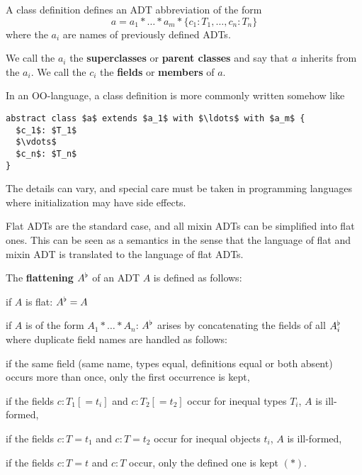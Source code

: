 \begin{definition}[Class]
A class definition defines an ADT abbreviation of the form
\[a = a_1*\ldots*a_m*\{c_1:T_1,\ldots,c_n:T_n\}\]
where the $a_i$ are names of previously defined ADTs.

We call the $a_i$ the \textbf{superclasses} or \textbf{parent classes} and say that $a$ inherits from the $a_i$.
We call the $c_i$ the \textbf{fields} or \textbf{members} of $a$.
\end{definition}

In an OO-language, a class definition is more commonly written somehow like
\begin{lstlisting}
abstract class $a$ extends $a_1$ with $\ldots$ with $a_m$ {
  $c_1$: $T_1$
  $\vdots$
  $c_n$: $T_n$
}
\end{lstlisting}
The details can vary, and special care must be taken in programming languages where initialization may have side effects.

Flat ADTs are the standard case, and all mixin ADTs can be simplified into flat ones.
This can be seen as a semantics in the sense that the language of flat and mixin ADT is translated to the language of flat ADTs.
\begin{definition}\label{def:mixinflat}
The \textbf{flattening} $A^\flat$ of an ADT $A$ is defined as follows:
\begin{compactitem}
 \item if $A$ is flat: $A^\flat=A$
 \item if $A$ is of the form $A_1*\ldots*A_n$:
 $A^\flat$ arises by concatenating the fields of all $A_i^\flat$ where duplicate field names are handled as follows:
  \begin{compactitem}
   \item if the same field (same name, types equal, definitions equal or both absent) occurs more than once, only the first occurrence is kept,
   \item if the fields $c:T_1[=t_i]$ and $c:T_2[=t_2]$ occur for inequal types $T_i$, $A$ is ill-formed,
   \item if the fields $c:T=t_1$ and $c:T=t_2$ occur for inequal objects $t_i$, $A$ is ill-formed,
   \item if the fields $c:T=t$ and $c:T$ occur, only the defined one is kept $(\ast)$.
  \end{compactitem}
\end{compactitem}
\end{definition}

